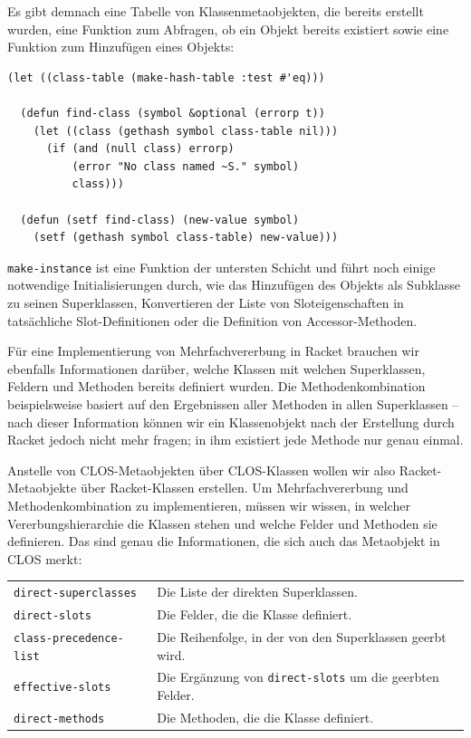 Es gibt demnach eine Tabelle von Klassenmetaobjekten, die bereits erstellt wurden, eine Funktion zum Abfragen, ob ein Objekt bereits existiert sowie eine Funktion zum Hinzufügen eines Objekts:

\begin{lstlisting}
(let ((class-table (make-hash-table :test #'eq)))
  
  (defun find-class (symbol &optional (errorp t))
    (let ((class (gethash symbol class-table nil)))
      (if (and (null class) errorp)
          (error "No class named ~S." symbol)
          class)))
  
  (defun (setf find-class) (new-value symbol)
    (setf (gethash symbol class-table) new-value)))
\end{lstlisting}

\texttt{make-instance} ist eine Funktion der untersten Schicht und führt noch einige notwendige Initialisierungen durch, wie das Hinzufügen des Objekts als Subklasse zu seinen Superklassen, Konvertieren der Liste von Sloteigenschaften in tatsächliche Slot-Definitionen oder die Definition von Accessor-Methoden. 

Für eine Implementierung von Mehrfachvererbung in Racket brauchen wir ebenfalls Informationen darüber, welche Klassen mit welchen Superklassen, Feldern und Methoden bereits definiert wurden. Die Methodenkombination beispielsweise basiert auf den Ergebnissen aller Methoden in allen Superklassen -- nach dieser Information können wir ein Klassenobjekt nach der Erstellung durch Racket jedoch nicht mehr fragen; in ihm existiert jede Methode nur genau einmal.

Anstelle von CLOS-Metaobjekten über CLOS-Klassen wollen wir also Racket-Metaobjekte über Racket-Klassen erstellen. Um Mehrfachvererbung und Methodenkombination zu implementieren, müssen wir wissen, in welcher Vererbungshierarchie die Klassen stehen und welche Felder und Methoden sie definieren. Das sind genau die Informationen, die sich auch das Metaobjekt in CLOS merkt:

\begin{tabular}{p{5cm}p{9cm}}
 \texttt{direct-superclasses} & Die Liste der direkten Superklassen. \\
 \texttt{direct-slots} & Die Felder, die die Klasse definiert. \\
 \texttt{class-precedence-list} & Die Reihenfolge, in der von den Superklassen geerbt wird.\\
 \texttt{effective-slots} & Die Ergänzung von \texttt{direct-slots} um die geerbten Felder. \\
 \texttt{direct-methods} & Die Methoden, die die Klasse definiert.
\end{tabular}

